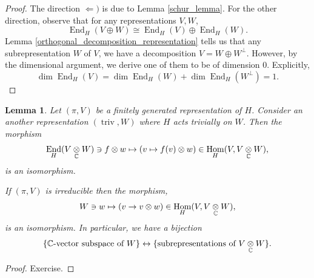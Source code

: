 \documentclass[8pt]{article}
\newtheorem{lemma}{Lemma}[section]
\DeclareMathOperator{\triv}{triv}
\DeclareMathOperator{\Hom}{Hom}
\DeclareMathOperator{\End}{End}
\newcommand{\C}[0]{\mathbb{C}}
\newcommand{\tens}[1]{%
  \mathbin{\mathop{\otimes}\displaylimits_{#1}}%
}
\begin{document}
\begin{proof}
  The direction $\Leftarrow)$ is due to Lemma \ref{schur_lemma}. For the other direction, observe that for any representations $V,W$,
  \begin{equation*}
    \End_H(V\oplus W) \cong \End_H(V)\oplus\End_H(W).
  \end{equation*}
  Lemma \ref{orthogonal_decomposition_representation} tells us that any subrepresentation $W$ of $V$,
  we have a decomposition $V=W\oplus W^\perp$. However, by the dimensional argument, we derive one of them to be of dimension $0$.
  Explicitly,
  \begin{equation*}
  \dim \End_H(V) =\dim\End_H(W)+\dim\End_H(W^\perp) = 1. 
  \end{equation*}
\end{proof}

\begin{lemma}
  Let $(\pi,V)$ be a finitely generated representation of $H$.
  Consider an another representation $(\triv,W)$ where $H$ acts trivially on $W$. Then the morphism
  \begin{equation*}
    \End_H(V\tens{\C} W)\ni f\otimes w\mapsto(v\mapsto f(v)\otimes w)\in\Hom_H(V,V\tens{\C}W),
  \end{equation*}
  is an isomorphism.\\
  \par If $(\pi,V)$ is irreducible then the morphism,
  \begin{equation*}
    W\ni w\mapsto(v\to v\otimes w)\in\Hom_H(V,V\tens{\C}W),
  \end{equation*}
  is an isomorphism. In particular, we have a bijection 
  \begin{equation*}
    \{\text{$\C$-vector subspace of $W$}\}\leftrightarrow\{\text{subrepresentations of }V\tens{\C}W\}.
  \end{equation*}
  \label{subrepresentation_bijection}
\end{lemma}

\begin{proof}
  Exercise.
\end{proof}
\end{document}
